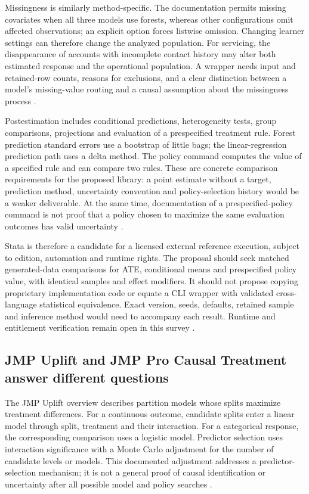 Missingness is similarly method-specific. The documentation permits missing
covariates when all three models use forests, whereas other configurations
omit affected observations; an explicit option forces listwise omission.
Changing learner settings can therefore change the analyzed population.
For servicing, the disappearance of accounts with incomplete contact history
may alter both estimated response and the operational population. A wrapper
needs input and retained-row counts, reasons for exclusions, and a clear
distinction between a model's missing-value routing and a causal assumption
about the missingness process \citep{exec13_ch_stata}.

Postestimation includes conditional predictions, heterogeneity tests, group
comparisons, projections and evaluation of a prespecified treatment rule.
Forest prediction standard errors use a bootstrap of little bags; the
linear-regression prediction path uses a delta method. The policy command
computes the value of a specified rule and can compare two rules. These
are concrete comparison requirements for the proposed library: a point
estimate without a target, prediction method, uncertainty convention and
policy-selection history would be a weaker deliverable. At the same time,
documentation of a prespecified-policy command is not proof that a policy
chosen to maximize the same evaluation outcomes has valid uncertainty
\citep{exec13_ch_stata}.

Stata is therefore a candidate for a licensed external reference execution,
subject to edition, automation and runtime rights. The proposal should seek
matched generated-data comparisons for ATE, conditional means and
prespecified policy value, with identical samples and effect modifiers.
It should not propose copying proprietary implementation code or equate
a CLI wrapper with validated cross-language statistical equivalence.
Exact version, seeds, defaults, retained sample and inference method would
need to accompany each result. Runtime and entitlement verification remain
open in this survey \citep{exec13_ch_scope}.

\subsection{JMP Uplift and JMP Pro Causal Treatment answer different questions}

The JMP Uplift overview describes partition models whose splits maximize
treatment differences. For a continuous outcome, candidate splits enter a
linear model through split, treatment and their interaction. For a
categorical response, the corresponding comparison uses a logistic model.
Predictor selection uses interaction significance with a Monte Carlo
adjustment for the number of candidate levels or models. This documented
adjustment addresses a predictor-selection mechanism; it is not a general
proof of causal identification or uncertainty after all possible model and
policy searches \citep{exec13_ch_jmp_uplift}.

